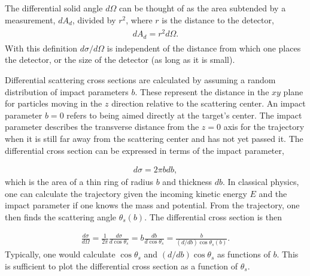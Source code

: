 \documentclass[letterpaper,10pt,english]{sphinxmanual}
\begin{document}
The differential solid angle \(d\Omega\) can be thought of as the area
subtended by a measurement, \(dA_d\), divided by \(r^2\), where \(r\) is the
distance to the detector,
\begin{equation*}
\begin{split}
\begin{eqnarray}
dA_d=r^2 d\Omega.
\end{eqnarray}
\end{split}
\end{equation*}
With this definition \(d\sigma/d\Omega\) is independent of the distance
from which one places the detector, or the size of the detector (as
long as it is small).

Differential scattering cross sections are calculated by assuming a
random distribution of impact parameters \(b\). These represent the
distance in the \(xy\) plane for particles moving in the \(z\) direction
relative to the scattering center. An impact parameter \(b=0\) refers to
being aimed directly at the target’s center. The impact parameter
describes the transverse distance from the \(z=0\) axis for the
trajectory when it is still far away from the scattering center and
has not yet passed it. The differential cross section can be expressed
in terms of the impact parameter,




\begin{equation*}
\begin{split}
\begin{equation}
d\sigma=2\pi bdb,
\label{_auto79} \tag{108}
\end{equation}
\end{split}
\end{equation*}
which is the area of a thin ring of radius \(b\) and thickness \(db\). In
classical physics, one can calculate the trajectory given the incoming
kinetic energy \(E\) and the impact parameter if one knows the mass and
potential. From the trajectory, one then finds the scattering angle
\(\theta_s(b)\). The differential cross section is then




\begin{equation*}
\begin{split}
\begin{equation}
\frac{d\sigma}{d\Omega}=\frac{1}{2\pi}\frac{d\sigma}{d\cos\theta_s}=b\frac{db}{d\cos\theta_s}=\frac{b}{(d/db)\cos\theta_s(b)}.
\label{_auto80} \tag{109}
\end{equation}
\end{split}
\end{equation*}
Typically, one would calculate \(\cos\theta_s\) and \((d/db)\cos\theta_s\)
as functions of \(b\). This is sufficient to plot the differential cross
section as a function of \(\theta_s\).
\end{document}
